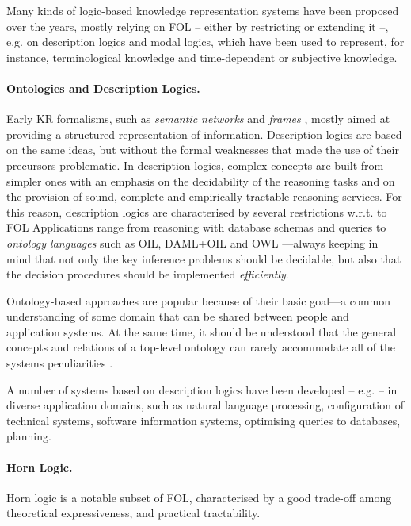 \documentclass[12pt,a4paper,openright,twoside]{book}
\begin{document}
Many kinds of logic-based knowledge representation systems have been proposed over the years, mostly relying on FOL -- either by restricting or extending it --, e.g. on description logics and modal logics, which have been used to represent, for instance, terminological knowledge and time-dependent or subjective knowledge.

\paragraph{Ontologies and Description Logics.}

Early KR formalisms, such as \emph{semantic networks} and \emph{frames} \cite{sowa2014}, mostly aimed at providing a structured representation of information.
%
Description logics are based on the same ideas, but without the formal weaknesses that made the use of their precursors problematic. 
%
In description logics, complex concepts are built from simpler ones with an emphasis on the decidability of the reasoning tasks and on the provision of sound, complete and empirically-tractable reasoning services. 
%
For this reason, description logics are characterised by several restrictions w.r.t. to FOL
%
Applications range from reasoning with database schemas and queries \cite{artale2002} to \emph{ontology languages} such as OIL, DAML+OIL and OWL \cite{horrocks2005}---always keeping in mind that not only the key inference problems should be decidable, but also that the decision procedures should be implemented \emph{efficiently}.

Ontology-based approaches are popular because of their basic goal---a common understanding of some domain that can be shared between people and application systems.
%
At the same time, it should be understood that the general concepts and relations of a top-level ontology can rarely accommodate all of the systems peculiarities \cite{van2008,valente2005}.

A number of systems based on description logics have been developed -- e.g. \cite{cohen1994,moller2003} -- in diverse application domains, such as natural language processing, configuration of technical systems, software information systems, optimising queries to databases, planning.

\paragraph{Horn Logic.}

Horn logic is a notable subset of FOL, characterised by a good trade-off among theoretical expressiveness, and practical tractability.
\end{document}
